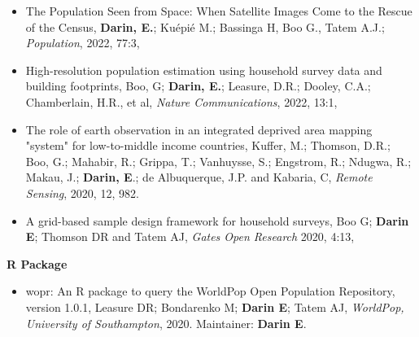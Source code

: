 \documentclass[
]{friggeri-cv}
\begin{document}
\begin{noside}
\begin{itemize}
\item The Population Seen from Space: When Satellite Images Come to the Rescue of the Census, \textbf{Darin, E.}; Kuépié M.; Bassinga H, Boo G., Tatem A.J.; \textit{Population}, 2022, 77:3, \href{https://doi.org/10.3917/popu.2203.0467}{\scriptsize{}}
\item High-resolution population estimation using household survey data and building footprints, Boo, G; \textbf{Darin, E.}; Leasure, D.R.; Dooley, C.A.; Chamberlain, H.R., et al, \textit{Nature Communications}, 2022, 13:1,    \href{https://www.nature.com/articles/s41467-022-29094-x}{\scriptsize{}}
\item The role of earth observation in an integrated deprived area mapping "system" for low-to-middle income countries, Kuffer, M.; Thomson, D.R.; Boo, G.; Mahabir, R.; Grippa, T.; Vanhuysse, S.; Engstrom, R.; Ndugwa, R.; Makau, J.; \textbf{Darin, E}.; de Albuquerque, J.P. and Kabaria, C, \textit{Remote Sensing}, 2020, 12, 982.    \href{https://www.mdpi.com/2072-4292/12/6/982}{\scriptsize{}} 
\item A grid-based sample design framework for household surveys, Boo G; \textbf{Darin E}; Thomson DR and Tatem AJ, \textit{Gates Open Research} 2020, 4:13, \href{https://gatesopenresearch.org/articles/4-13/v1}{\scriptsize{}}

\end{itemize}

\textbf{R Package}
\begin{itemize}
\item wopr: An R package to query the WorldPop Open Population Repository, version 1.0.1, Leasure DR; Bondarenko M; \textbf{Darin E}; Tatem AJ, \textit{WorldPop, University of Southampton}, 2020. Maintainer: \textbf{Darin E}. \href{https://apps.worldpop.org/woprVision/}{\scriptsize{}}
\end{itemize}


\end{noside}
\end{document}
